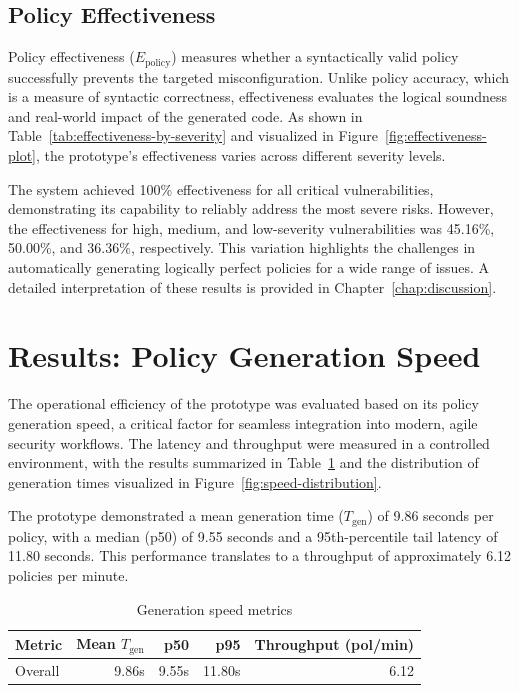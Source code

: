 \subsection{Policy Effectiveness}
Policy effectiveness ($E_{\text{policy}}$) measures whether a syntactically valid policy successfully prevents the targeted misconfiguration. Unlike policy accuracy, which is a measure of syntactic correctness, effectiveness evaluates the logical soundness and real-world impact of the generated code. As shown in Table~\ref{tab:effectiveness-by-severity} and visualized in Figure~\ref{fig:effectiveness-plot}, the prototype's effectiveness varies across different severity levels.

The system achieved 100\% effectiveness for all critical vulnerabilities, demonstrating its capability to reliably address the most severe risks. However, the effectiveness for high, medium, and low-severity vulnerabilities was 45.16\%, 50.00\%, and 36.36\%, respectively. This variation highlights the challenges in automatically generating logically perfect policies for a wide range of issues. A detailed interpretation of these results is provided in Chapter~\ref{chap:discussion}.

\section{Results: Policy Generation Speed}\label{sec:results-speed}

The operational efficiency of the prototype was evaluated based on its policy generation speed, a critical factor for seamless integration into modern, agile security workflows. The latency and throughput were measured in a controlled environment, with the results summarized in Table~\ref{tab:speed-metrics} and the distribution of generation times visualized in Figure~\ref{fig:speed-distribution}.

The prototype demonstrated a mean generation time ($T_{\text{gen}}$) of 9.86 seconds per policy, with a median (p50) of 9.55 seconds and a 95th-percentile tail latency of 11.80 seconds. This performance translates to a throughput of approximately 6.12 policies per minute.

\begin{table}[htbp]
	\centering
		\caption{Generation speed metrics}\label{tab:speed-metrics}
	\begin{tabular}{lrrrr}
		\hline
		Metric & Mean $T_{\text{gen}}$ & p50 & p95 & Throughput (pol/min) \\
		\hline
		Overall & 9.86s & 9.55s & 11.80s & 6.12 \\
		\hline
	\end{tabular}
\end{table}

